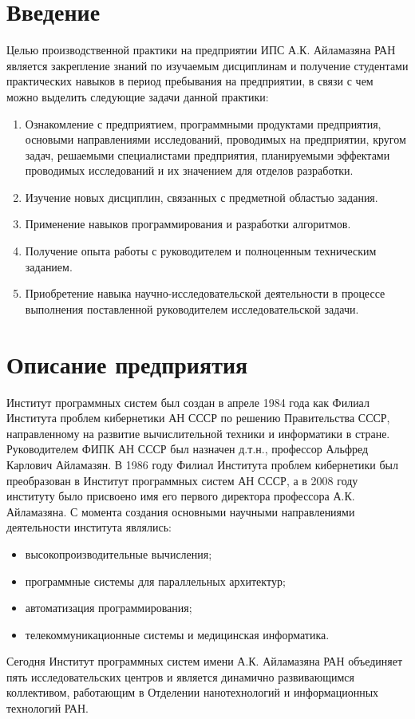 \documentclass[12pt]{article}
\begin{document}
\tableofcontents

\section{Введение}

Целью производственной практики на предприятии ИПС А.К. Айламазяна РАН является
закрепление знаний по изучаемым дисциплинам и получение студентами практических
навыков в период пребывания на предприятии, в связи с чем можно выделить
следующие задачи данной практики:
\begin{enumerate}
\item Ознакомление с предприятием, программными продуктами предприятия,
основыми направлениями исследований, проводимых на предприятии, кругом задач,
решаемыми специалистами предприятия, планируемыми эффектами проводимых
исследований и их значением для отделов разработки.
\item Изучение новых дисциплин, связанных с предметной областью задания.
\item Применение навыков программирования и разработки алгоритмов.
\item Получение опыта работы с руководителем и полноценным техническим
заданием.
\item Приобретение навыка научно-исследовательской деятельности в процессе
выполнения поставленной руководителем исследовательской задачи.
\end{enumerate}



\section{Описание предприятия}

Институт программных систем был создан в апреле 1984 года как Филиал Института
проблем кибернетики АН СССР по решению Правительства СССР, направленному на
развитие вычислительной техники и информатики в стране. Руководителем ФИПК АН
СССР был назначен д.т.н., профессор Альфред Карлович Айламазян. В 1986 году
Филиал Института проблем кибернетики был преобразован в Институт программных
систем АН СССР, а в 2008 году институту было присвоено имя его первого
директора профессора А.К. Айламазяна. С момента создания основными научными
направлениями деятельности института являлись:
\begin{itemize}
\item высокопроизводительные вычисления;
\item программные системы для параллельных архитектур;
\item автоматизация программирования;
\item телекоммуникационные системы и медицинская информатика.
\end{itemize}
Сегодня Институт программных систем имени А.К. Айламазяна РАН объединяет пять
исследовательских центров и является динамично развивающимся коллективом,
работающим в Отделении нанотехнологий и информационных технологий РАН.
\end{document}
